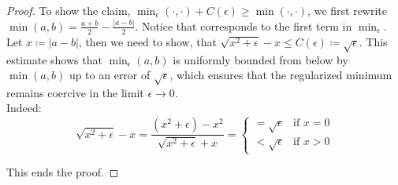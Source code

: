 \documentclass[12pt,openany]{book}
\theoremstyle{plainnormal}
\theoremstyle{remark}
\begin{document}
\begin{proof}
To show the claim, $\min_\epsilon(\cdot, \cdot) + C(\epsilon) \geq \min(\cdot, \cdot)$, we first rewrite $\min(a,b) = \frac{a+b}{2} - \frac{|a-b|}{2}$. Notice that corresponds to the first term in $\min_\epsilon$. Let $x \coloneqq |a-b|$, then we need to show, that $\sqrt{x^2 + \epsilon } -x \leq C(\epsilon) \coloneqq \sqrt{\epsilon}$. This estimate shows that \(\min_\epsilon(a, b)\) is uniformly bounded from below by \(\min(a, b)\) up to an error of \(\sqrt{\epsilon}\), 
which ensures that the regularized minimum remains coercive in the limit \(\epsilon \to 0\). \\
Indeed: $$\sqrt{x^2 + \epsilon } -x = \frac{(x^2+\epsilon) - x^2}{\sqrt{x^2+\epsilon} + x} = 
\begin{cases}
= \sqrt{\epsilon} & \text{if } x = 0 \\
< \sqrt{\epsilon} & \text{if } x > 0
\end{cases}$$

This ends the proof.
\end{proof}
\clearpage
\end{document}
